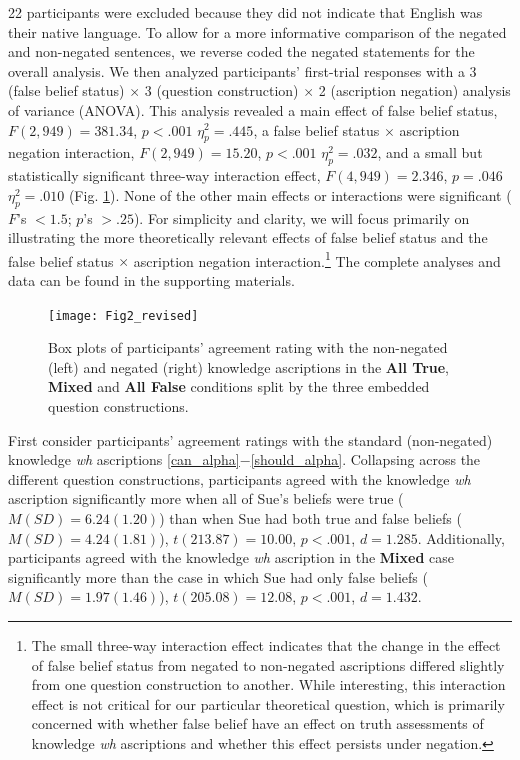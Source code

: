 \documentclass[a4paper]{article}
\begin{document}
22 participants were excluded because they did not indicate that English was their native language. To allow for a more informative comparison of the negated and non-negated sentences, we reverse coded the negated statements for the overall analysis. We then analyzed participants' first-trial responses with a 3 (false belief status) $\times$ 3 (question construction) $\times$ 2 (ascription negation) analysis of variance (ANOVA). This analysis revealed a main effect of false belief status, $F(2,949) = 381.34$, $p < .001$ $\eta_{p}^{2} = .445$, a false belief status $\times$ ascription negation interaction, $F(2,949) = 15.20$, $p < .001$ $\eta_{p}^{2} = .032$, and a small but statistically significant three-way interaction effect, $F(4,949) = 2.346$, $p = .046$ $\eta_{p}^{2} = .010$ (Fig. \ref{fig:Fig2}). None of the other main effects or interactions were significant ($F$'s $< 1.5$; $p$'s $> .25$). For simplicity and clarity, we will focus primarily on illustrating the more theoretically relevant effects of false belief status and the false belief status $\times$ ascription negation interaction.\footnote{The small three-way interaction effect indicates that the change in the effect of false belief status from negated to non-negated ascriptions differed slightly from one question construction to another. While interesting, this interaction effect is not critical for our particular theoretical question, which is primarily concerned with whether false belief have an effect on truth assessments of knowledge \textit{wh} ascriptions and whether this effect persists under negation.} The complete analyses and data can be found in the supporting materials.

\begin{figure}[h!]
\centering
\texttt{[image: Fig2\_revised]}
\captionsetup{width=0.9\textwidth}
\caption{Box plots of participants' agreement rating with the non-negated (left) and negated (right) knowledge ascriptions in the \textbf{All True}, \textbf{Mixed} and \textbf{All False} conditions split by the three embedded question constructions.}
\label{fig:Fig2}
\end{figure}

First consider participants' agreement ratings with the standard (non-negated) knowledge \textit{wh} ascriptions \ref{can_alpha}$-$\ref{should_alpha}. Collapsing across the different question constructions, participants agreed with the knowledge \textit{wh} ascription significantly more when all of Sue's beliefs were true (${M}({SD}) = 6.24(1.20)$) than when Sue had both true and false beliefs (${M}({SD}) = 4.24(1.81)$), ${t}(213.87) = 10.00$, ${p} < .001$, $d = 1.285$. Additionally, participants agreed with the knowledge \textit{wh} ascription in the \textbf{Mixed} case significantly more than the case in which Sue had only false beliefs ($M({SD}) = 1.97(1.46)$), ${t}(205.08) = 12.08$, ${p} < .001$, $d = 1.432$. 
\end{document}

